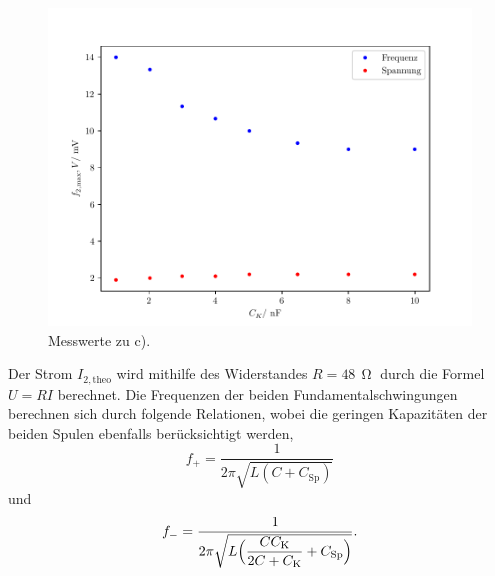 \begin{figure}[H]
  \centering
  \includegraphics{freq2.pdf}
  \caption{Messwerte zu c).}
  \label{fig:freq2}
\end{figure}

\noindent Der Strom $I_{2,\text{theo}}$ wird mithilfe des Widerstandes $R= 48 \,\upOmega$ durch die Formel $U=RI$ berechnet. Die Frequenzen der 
beiden Fundamentalschwingungen berechnen sich durch folgende Relationen, wobei
die geringen Kapazitäten der beiden Spulen ebenfalls berücksichtigt werden,
\begin{equation}
  f_+ = \frac{1}{2\pi\sqrt{L(C + C_\text{Sp})}}
\end{equation} 
und \newline 
\begin{equation}
  f_- = \frac{1}{2\pi\sqrt{L\Bigl(\dfrac{CC_\text{K}}{2C+C_\text{K}} + C_\text{Sp}\Bigr)}}.
\end{equation}


